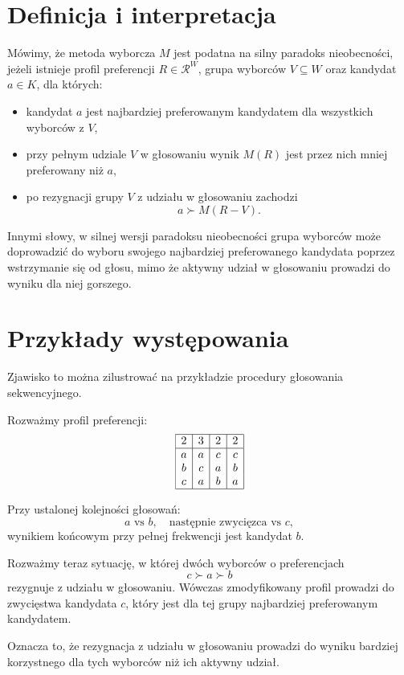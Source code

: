 \documentclass[12pt,a4paper]{mwrep}
\begin{document}
	\section{Definicja i interpretacja}
	
	\begin{definition}
		Mówimy, że metoda wyborcza \(M\) jest podatna na silny paradoks nieobecności, jeżeli istnieje profil preferencji \(R \in \mathcal{R}^{W}\), grupa wyborców \(V \subseteq W\) oraz kandydat \(a \in K\), dla których:
		\begin{itemize}
			\item kandydat \(a\) jest najbardziej preferowanym kandydatem dla wszystkich wyborców z \(V\),
			\item przy pełnym udziale \(V\) w głosowaniu wynik \(M(R)\) jest przez nich mniej preferowany niż \(a\),
			\item po rezygnacji grupy \(V\) z udziału w głosowaniu zachodzi
			\[
			a \succ M(R - V).
			\]
		\end{itemize}
	\end{definition}
	
	Innymi słowy, w silnej wersji paradoksu nieobecności grupa wyborców może doprowadzić do wyboru swojego najbardziej preferowanego kandydata poprzez wstrzymanie się od głosu, mimo że aktywny udział w głosowaniu prowadzi do wyniku dla niej gorszego.
	
	\medskip
	
	\section{Przykłady występowania}
	
	Zjawisko to można zilustrować na przykładzie procedury głosowania sekwencyjnego.
	
	\begin{example}
		Rozważmy profil preferencji:
		\[
		\begin{array}{|c|c|c|c|}
			\hline
			2 & 3 & 2 & 2\\
			\hline
			a & a & c & c\\
			b & c & a & b\\
			c & a & b & a\\
			\hline
		\end{array}
		\]
		
		Przy ustalonej kolejności głosowań:
		\[
		a \text{ vs } b,\quad \text{następnie zwycięzca vs } c,
		\]
		wynikiem końcowym przy pełnej frekwencji jest kandydat \(b\).
		
		Rozważmy teraz sytuację, w której dwóch wyborców o preferencjach
		\[
		c \succ a \succ b
		\]
		rezygnuje z udziału w głosowaniu. Wówczas zmodyfikowany profil prowadzi do zwycięstwa kandydata \(c\), który jest dla tej grupy najbardziej preferowanym kandydatem.
		
		Oznacza to, że rezygnacja z udziału w głosowaniu prowadzi do wyniku bardziej korzystnego dla tych wyborców niż ich aktywny udział.
	\end{example}
	
\end{document}
